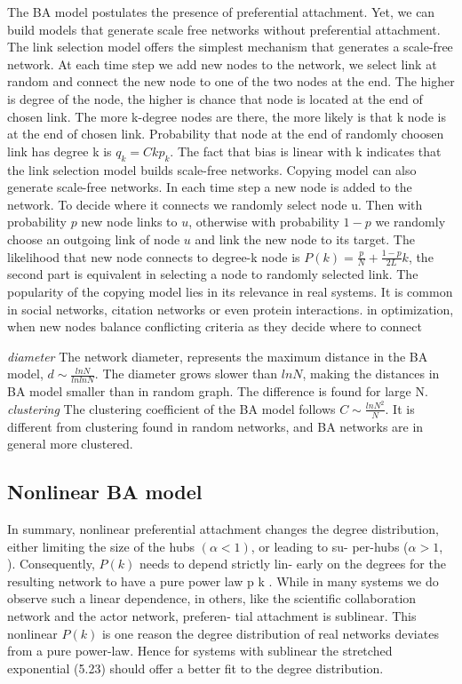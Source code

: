 The BA model postulates the presence of preferential attachment. Yet, we can build models that generate scale free networks without preferential attachment. The link selection model offers the simplest mechanism that generates a scale-free network. At each time step we add new nodes to the network, we select link at random and connect the new node to one of the two nodes at the end. The higher is degree of the node, the higher is chance that node is located at the end of chosen link. The more k-degree nodes are there, the more likely is that k node is at the end of chosen link. Probability that node at the end of randomly choosen link has degree k is $q_k = Ckp_k$. The fact that bias is linear with k indicates that the link selection model builds scale-free networks. 
Copying model can also generate scale-free networks. In each time step a new node is added to the network. To decide where it connects we randomly select node u. Then with probability $p$ new node links to $u$, otherwise with probability $1-p$ we randomly choose an outgoing link of node $u$ and link the new node to its target. The likelihood that new node connects to degree-k node is $P(k)=\frac{p}{N} + \frac{1-p}{2L}k$, the second part is equivalent in selecting a node to randomly selected link. The popularity of the copying model lies in its relevance in real systems. It is common in social networks, citation networks or even protein interactions. 
in optimization, when new nodes balance conflicting criteria as they decide where to connect

\textit{diameter}
The network diameter, represents the maximum distance in the BA model, $d \sim \frac{lnN}{lnlnN}$. The diameter grows slower than $lnN$, making the distances in BA model smaller than in random graph. The difference is found for large N. 
\textit{clustering}
The clustering coefficient of the BA model follows $C \sim \frac{ln N^2}{N}$. It is different from clustering found in random networks, and BA networks are in general more clustered. 

\subsection{Nonlinear BA model}

In summary, nonlinear preferential attachment changes the degree
distribution, either limiting the size of the hubs $(\alpha < 1)$, or leading to su-
per-hubs ($\alpha > 1$, ). Consequently, $P(k)$ needs to depend strictly lin-
early on the degrees for the resulting network to have a pure power law p k .
While in many systems we do observe such a linear dependence, in others,
like the scientific collaboration network and the actor network, preferen-
tial attachment is sublinear. This nonlinear $P(k)$ is one reason the degree
distribution of real networks deviates from a pure power-law. Hence for
systems with sublinear  the stretched exponential (5.23) should offer a
better fit to the degree distribution.


